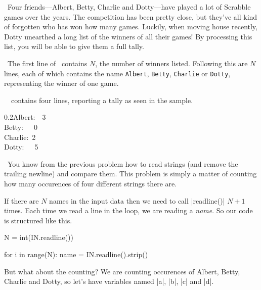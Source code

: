 

\Question\ Four friends---Albert, Betty, Charlie and Dotty---have played a lot of Scrabble
games over the years. The competition has been pretty close, but they've all kind of
forgotten who has won how many games. Luckily, when moving house recently, Dotty unearthed
a long list of the winners of all their games! By processing this list, you will be able
to give them a full tally.

\Input\ The first line of \IN\ contains $N$, the number of winners listed. Following this
are $N$ lines, each of which contains the name \texttt{Albert}, \texttt{Betty},
\texttt{Charlie} or \texttt{Dotty}, representing the winner of one game.

\Output\ \OUT\ contains four lines, reporting a tally as seen in the sample.

\Sample

       {0.2}{Albert:~~3\\Betty:~~~0\\Charlie:~2\\Dotty:~~~5}

\Scratch\ You know from the previous problem how to read strings (and remove the trailing
newline) and compare them. This problem is simply a matter of counting how many occurences
of four different strings there are.

If there are $N$ names in the input data then we need to call \pycode|readline()| $N+1$
times. Each time we read a line in the loop, we are reading a \emph{name}. So our code is
structured like this.

\begin{pythoncode}
  N = int(IN.readline())

  for i in range(N):
    name = IN.readline().strip()
\end{pythoncode}

But what about the counting? We are counting occurences of Albert, Betty, Charlie and
Dotty, so let's have variables named \pycode|a|, \pycode|b|, \pycode|c| and \pycode|d|.


